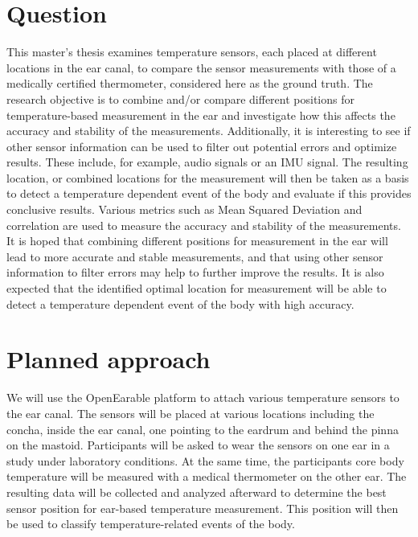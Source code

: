 \section{Question}
This master's thesis examines temperature sensors, each placed at different locations in the ear canal, to compare the sensor measurements with those of a medically certified thermometer, considered here as the ground truth.
The research objective is to combine and/or compare different positions for temperature-based measurement in the ear and investigate how this affects the accuracy and stability of the measurements.
Additionally, it is interesting to see if other sensor information can be used to filter out potential errors and optimize results. These include, for example, audio signals or an IMU signal. The resulting location, or combined locations for the measurement will then be taken as a basis to detect a temperature dependent event of the body and evaluate if this provides conclusive results.
Various metrics such as Mean Squared Deviation and correlation are used to measure the accuracy and stability of the measurements.
It is hoped that combining different positions for measurement in the ear will lead to more accurate and stable measurements, and that using other sensor information to filter errors may help to further improve the results. It is also expected that the identified optimal location for measurement will be able to detect a temperature dependent event of the body with high accuracy.


\section{Planned approach}
We will use the OpenEarable platform to attach various temperature sensors to the ear canal. 
The sensors will be placed at various locations including the concha, inside the ear canal, one pointing to the eardrum and behind the pinna on the mastoid. 
Participants will be asked to wear the sensors on one ear in a study under laboratory conditions.
At the same time, the participants core body temperature will be measured with a medical thermometer on the other ear.
The resulting data will be collected and analyzed afterward to determine the best sensor position for ear-based temperature measurement. This position will then be used to classify temperature-related events of the body.


